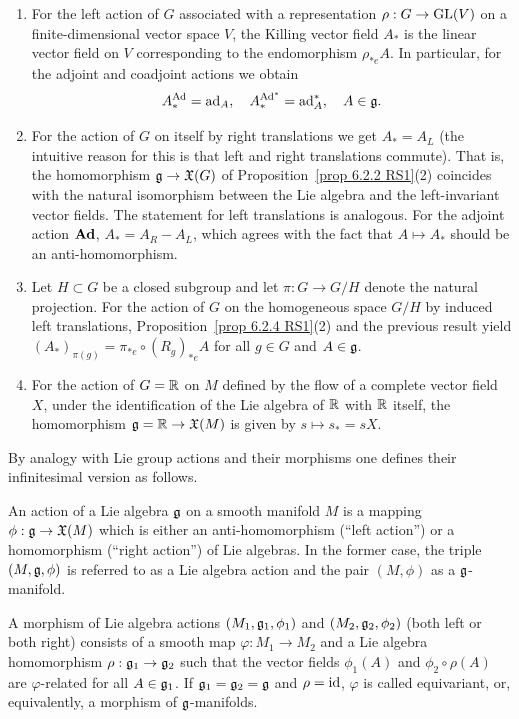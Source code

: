 \begin{example}
    \begin{enumerate}
        \item For the left action of $G$ associated with a representation $\rho:G\to \operatorname{GL}(V)$ on a finite-dimensional vector space $V$, the Killing vector field $A_\ast$ is the linear vector field on $V$ corresponding to the endomorphism $\rho_{\ast e}A$. In particular, for the adjoint and coadjoint actions we obtain
        \[A_\ast^{\mathrm{Ad}}=\mathrm{ad}_A,\quad A_\ast^{\mathrm{Ad}^\ast}=\mathrm{ad}^\ast_A,\quad A\in\mathfrak{g}.\]
        \item For the action of $G$ on itself by right translations we get $A_\ast=A_L$ (the intuitive reason for this is that left and right translations commute). That is, the homomorphism $\mathfrak{g}\to \mathfrak{X}(G)$ of Proposition~\ref{prop 6.2.2 RS1}(2) coincides with the natural isomorphism between the Lie algebra and the left-invariant vector fields. The statement for left translations is analogous. For the adjoint action $\mathrm{\mathbf{Ad}}$, $A_\ast=A_R-A_L$, which agrees with the fact that $A\mapsto A_\ast$ should be an anti-homomorphism.
        \item Let $H\subset G$ be a closed subgroup and let $\pi:G\to G\slash H$ denote the natural projection. For the action of $G$ on the homogeneous space $G\slash H$ by induced left translations, Proposition~\ref{prop 6.2.4 RS1}(2) and the previous result yield $(A_\ast)_{\pi(g)}=\pi_{\ast e}\circ (R_g)_{\ast e}A$ for all $g\in G$ and $A\in\mathfrak{g}$.
        \item For the action of $G=\mathbb{R}$ on $M$ defined by the flow of a complete vector field $X$, under the identification of the Lie algebra of $\mathbb{R}$ with $\mathbb{R}$ itself, the homomorphism $\mathfrak{g}=\mathbb{R}\to \mathfrak{X}(M)$ is given by $s\mapsto s_\ast=sX$.
    \end{enumerate}
\end{example}


By analogy with Lie group actions and their morphisms one defines their infinitesimal version as follows.

\begin{defn}
    An action of a Lie algebra $\mathfrak{g}$ on a smooth manifold $M$ is a mapping $\phi:\mathfrak{g}\to \mathfrak{X}(M)$ which is either an anti-homomorphism  (``left action'') or a homomorphism (``right action'') of Lie algebras. In the former case, the triple $(M,\mathfrak{g},\phi)$ is referred to as a Lie algebra action and the pair $(M,\phi)$ as a $\mathfrak{g}$-manifold.

    A morphism of Lie algebra actions $(M_1,\mathfrak{g}_1,\phi_1)$ and $(M_2,\mathfrak{g}_2,\phi_2)$ (both left or both right) consists of a smooth map $\varphi:M_1\to M_2$ and a Lie algebra homomorphism $\rho:\mathfrak{g}_1\to\mathfrak{g}_2$ such that the vector fields $\phi_1(A)$ and $\phi_2\circ\rho(A)$ are $\varphi$-related for all $A\in\mathfrak{g}_1$. If $\mathfrak{g}_1=\mathfrak{g}_2=\mathfrak{g}$ and $\rho=\operatorname{id}$, $\varphi$ is called equivariant, or, equivalently, a morphism of $\mathfrak{g}$-manifolds.
\end{defn}

